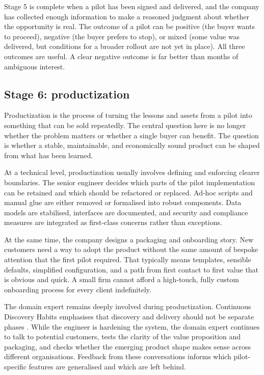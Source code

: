 \documentclass[10pt, a4paper, twocolumn]{article} %
\begin{document}
Stage 5 is complete when a pilot has been signed and delivered, and the company has collected enough information to make a reasoned judgment about whether the opportunity is real. The outcome of a pilot can be positive (the buyer wants to proceed), negative (the buyer prefers to stop), or mixed (some value was delivered, but conditions for a broader rollout are not yet in place). All three outcomes are useful. A clear negative outcome is far better than months of ambiguous interest.

\subsection{Stage 6: productization}

Productization is the process of turning the lessons and assets from a pilot into something that can be sold repeatedly. The central question here is no longer whether the problem matters or whether a single buyer can benefit. The question is whether a stable, maintainable, and economically sound product can be shaped from what has been learned.

At a technical level, productization usually involves defining and enforcing clearer boundaries. The senior engineer decides which parts of the pilot implementation can be retained and which should be refactored or replaced. Ad-hoc scripts and manual glue are either removed or formalised into robust components. Data models are stabilised, interfaces are documented, and security and compliance measures are integrated as first-class concerns rather than exceptions.

At the same time, the company designs a packaging and onboarding story. New customers need a way to adopt the product without the same amount of bespoke attention that the first pilot required. That typically means templates, sensible defaults, simplified configuration, and a path from first contact to first value that is obvious and quick. A small firm cannot afford a high-touch, fully custom onboarding process for every client indefinitely.

The domain expert remains deeply involved during productization. Continuous Discovery Habits emphasises that discovery and delivery should not be separate phases \citep{torres2021continuous}. While the engineer is hardening the system, the domain expert continues to talk to potential customers, tests the clarity of the value proposition and packaging, and checks whether the emerging product shape makes sense across different organisations. Feedback from these conversations informs which pilot-specific features are generalised and which are left behind.
\end{document}

